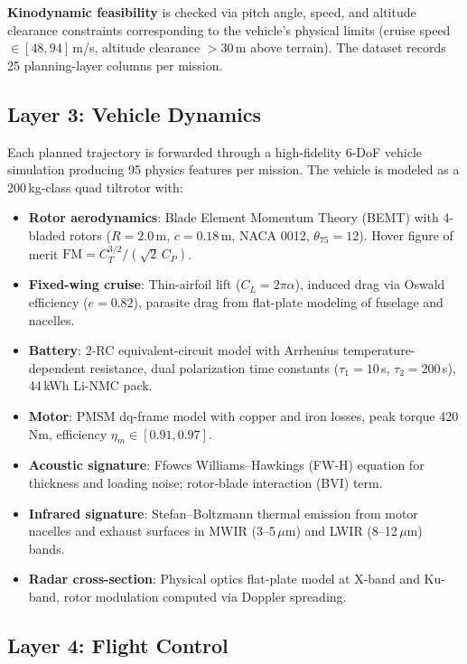 \documentclass{article}
\begin{document}
\textbf{Kinodynamic feasibility} is checked via pitch angle, speed, and
altitude clearance constraints corresponding to the vehicle's physical limits
(cruise speed $\in [48, 94]$\,m/s, altitude clearance $> 30$\,m above terrain).
The dataset records 25 planning-layer columns per mission.

\subsection{Layer 3: Vehicle Dynamics}
\label{sec:vehicle}

Each planned trajectory is forwarded through a high-fidelity 6-DoF vehicle
simulation producing 95 physics features per mission. The vehicle is modeled
as a 200\,kg-class quad tiltrotor with:

\begin{itemize}
  \item \textbf{Rotor aerodynamics}: Blade Element Momentum Theory (BEMT)
    with 4-bladed rotors ($R = 2.0$\,m, $c = 0.18$\,m, NACA 0012, $\theta_{75} = 12$\textdegree{}).
    Hover figure of merit $\mathrm{FM} = C_T^{3/2} / (\sqrt{2}\,C_P)$.
  \item \textbf{Fixed-wing cruise}: Thin-airfoil lift ($C_L = 2\pi\alpha$),
    induced drag via Oswald efficiency ($e = 0.82$), parasite drag
    from flat-plate modeling of fuselage and nacelles.
  \item \textbf{Battery}: 2-RC equivalent-circuit model with Arrhenius
    temperature-dependent resistance, dual polarization time constants
    ($\tau_1 = 10$\,s, $\tau_2 = 200$\,s), 44\,kWh Li-NMC pack.
  \item \textbf{Motor}: PMSM dq-frame model with copper and iron losses,
    peak torque 420\,Nm, efficiency $\eta_m \in [0.91, 0.97]$.
  \item \textbf{Acoustic signature}: Ffowcs Williams--Hawkings (FW-H) equation
    for thickness and loading noise; rotor-blade interaction (BVI) term.
  \item \textbf{Infrared signature}: Stefan--Boltzmann thermal emission from
    motor nacelles and exhaust surfaces in MWIR (3--5\,$\mu$m) and LWIR
    (8--12\,$\mu$m) bands.
  \item \textbf{Radar cross-section}: Physical optics flat-plate model at
    X-band and Ku-band, rotor modulation computed via Doppler spreading.
\end{itemize}

\subsection{Layer 4: Flight Control}
\label{sec:control}
\end{document}
